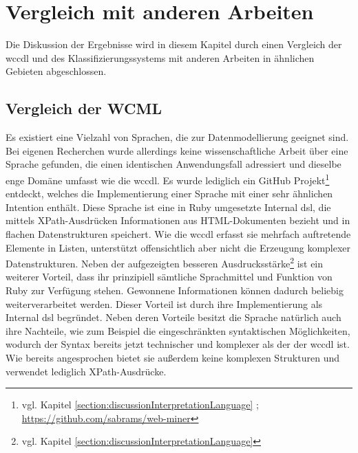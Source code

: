 \section{Vergleich mit anderen Arbeiten}
    Die Diskussion der Ergebnisse wird in diesem Kapitel
    durch einen Vergleich der \gls{wccdl} und des Klassifizierungssystems
    mit anderen Arbeiten in ähnlichen Gebieten abgeschlossen.

    \subsection{Vergleich der WCML}
        \label{section:discussionComparisonLanguage}
        Es existiert eine Vielzahl von Sprachen,
        die zur Datenmodellierung geeignet sind.
        Bei eigenen Recherchen wurde allerdings keine wissenschaftliche Arbeit über eine Sprache gefunden,
        die einen identischen Anwendungsfall adressiert und dieselbe enge Domäne umfasst wie die \gls{wccdl}.
        Es wurde lediglich ein
        GitHub Projekt\footnote{vgl. Kapitel \ref{section:discussionInterpretationLanguage} ; \url{https://github.com/sabrams/web-miner}} entdeckt,
        welches die Implementierung einer Sprache mit einer sehr ähnlichen Intention enthält.
        Diese Sprache ist eine in Ruby umgesetzte Internal \gls{dsl},
        die mittels XPath-Ausdrücken Informationen aus HTML-Dokumenten bezieht
        und in flachen Datenstrukturen speichert.
        Wie die \gls{wccdl} erfasst sie mehrfach auftretende Elemente in Listen,
        unterstützt offensichtlich aber nicht die Erzeugung komplexer Datenstrukturen.
        Neben der aufgezeigten besseren
        Ausdrucksstärke\footnote{vgl. Kapitel \ref{section:discussionInterpretationLanguage}}
        ist ein weiterer Vorteil,
        dass ihr prinzipiell sämtliche Sprachmittel und Funktion von Ruby
        zur Verfügung stehen.
        Gewonnene Informationen können dadurch beliebig weiterverarbeitet werden.
        Dieser Vorteil ist durch ihre Implementierung als Internal \gls{dsl} begründet.
        Neben deren Vorteile besitzt die Sprache natürlich auch ihre Nachteile,
        wie zum Beispiel die eingeschränkten syntaktischen Möglichkeiten,
        wodurch der Syntax bereits jetzt technischer und komplexer als der der \gls{wccdl} ist.
        Wie bereits angesprochen bietet sie außerdem keine komplexen Strukturen und verwendet lediglich XPath-Ausdrücke.

